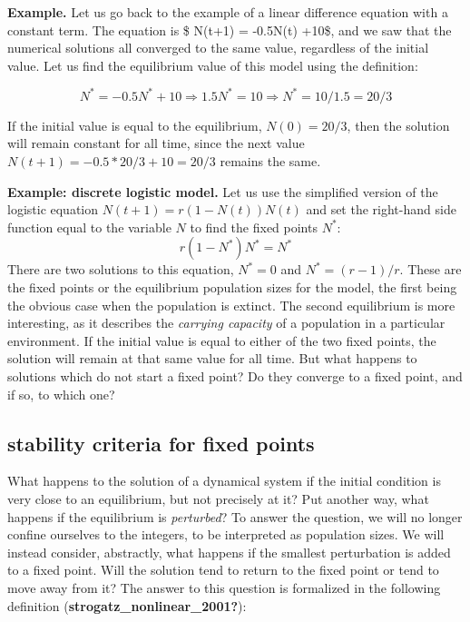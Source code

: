 \documentclass[
  letterpaper,
  DIV=11,
  numbers=noendperiod]{scrreprt}
\begin{document}
\textbf{Example.} Let us go back to the example of a linear difference
equation with a constant term. The equation is \$ N(t+1) = -0.5N(t)
+10\$, and we saw that the numerical solutions all converged to the same
value, regardless of the initial value. Let us find the equilibrium
value of this model using the definition:

\[
N^* = -0.5N^* +10 \Rightarrow 1.5 N^* = 10  \Rightarrow N^* = 10/1.5 = 20/3
\]

If the initial value is equal to the equilibrium, \(N(0)= 20/3\), then
the solution will remain constant for all time, since the next value
\(N(t+1) = -0.5*20/3+10 = 20/3\) remains the same.

\textbf{Example: discrete logistic model.} Let us use the simplified
version of the logistic equation \(N(t+1) = r(1 - N(t)) N(t)\) and set
the right-hand side function equal to the variable \(N\) to find the
fixed points \(N^*\): \[r(1 - N^*) N^* = N^*\] There are two solutions
to this equation, \(N^* = 0\) and \(N^* = (r-1)/r\). These are the fixed
points or the equilibrium population sizes for the model, the first
being the obvious case when the population is extinct. The second
equilibrium is more interesting, as it describes the \emph{carrying
capacity} of a population in a particular environment. If the initial
value is equal to either of the two fixed points, the solution will
remain at that same value for all time. But what happens to solutions
which do not start a fixed point? Do they converge to a fixed point, and
if so, to which one?

\hypertarget{stability-criteria-for-fixed-points}{%
\subsection{stability criteria for fixed
points}\label{stability-criteria-for-fixed-points}}

What happens to the solution of a dynamical system if the initial
condition is very close to an equilibrium, but not precisely at it? Put
another way, what happens if the equilibrium is \emph{perturbed}? To
answer the question, we will no longer confine ourselves to the
integers, to be interpreted as population sizes. We will instead
consider, abstractly, what happens if the smallest perturbation is added
to a fixed point. Will the solution tend to return to the fixed point or
tend to move away from it? The answer to this question is formalized in
the following definition (\textbf{strogatz\_nonlinear\_2001?}):
\end{document}
